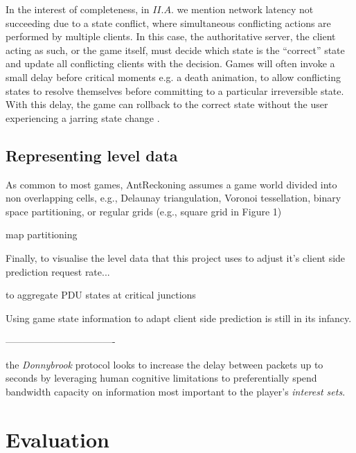\documentclass[journal]{IEEEtran}
\begin{document}
In the interest of completeness, in $II.A.$ we mention network latency not succeeding due to a state conflict, where simultaneous conflicting actions are performed by multiple clients. In this case, the authoritative server, the client acting as such, or the game itself, must decide which state is the ``correct'' state and update all conflicting clients with the decision. Games will often invoke a small delay before critical moments e.g. a death animation, to allow conflicting states to resolve themselves before committing to a particular irreversible state. With this delay, the game can rollback to the correct state without the user experiencing a jarring state change \cite{mauve2000keep}.

\subsection{Representing level data}

As common to most games, AntReckoning assumes
a game world divided into non overlapping cells,
e.g., Delaunay triangulation, Voronoi tessellation, binary space
partitioning, or regular grids (e.g., square grid in Figure 1)

\cite{bauckhage2014beyond}

\cite{kuipers1978modeling}

\cite{wilkinson2009history}

\cite{moumtzidou2013discovery}

\cite{drachen2013spatial}

map partitioning \cite{steed2003partitioning}

Finally, to visualise the level data that this project uses to adjust it's client side prediction request rate...

to aggregate PDU states at critical junctions

Using game state information to adapt client side prediction is still in its infancy.


----------------------------------



the \textit{Donnybrook} protocol \cite{bharambe2008donnybrook} looks to increase the delay between packets up to seconds by leveraging human cognitive limitations to preferentially spend bandwidth capacity on information most important to the player's \textit{interest sets}.




\section{Evaluation}
\end{document}
